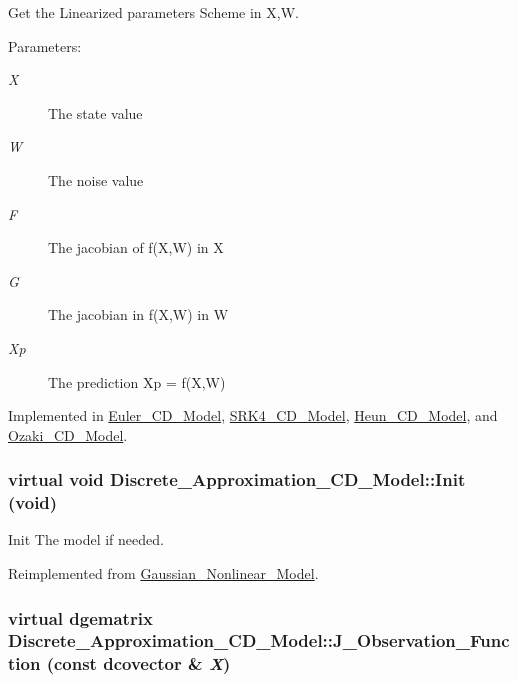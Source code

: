 Get the Linearized parameters Scheme in X,W. 

\begin{Desc}
\item[Parameters:]
\begin{description}
\item[{\em X}]The state value \item[{\em W}]The noise value \item[{\em F}]The jacobian of f(X,W) in X \item[{\em G}]The jacobian in f(X,W) in W \item[{\em Xp}]The prediction Xp = f(X,W) \end{description}
\end{Desc}


Implemented in \hyperlink{class_euler___c_d___model_e67b3130695db99e6057811914994aed}{Euler\_\-CD\_\-Model}, \hyperlink{class_s_r_k4___c_d___model_c348e8a59d0880ac366190004f4df36b}{SRK4\_\-CD\_\-Model}, \hyperlink{class_heun___c_d___model_38c51141d41b3c92509ab2c6040fd2cd}{Heun\_\-CD\_\-Model}, and \hyperlink{class_ozaki___c_d___model_c0878d9dda14cd1294e2ce7e5ab9c281}{Ozaki\_\-CD\_\-Model}.\hypertarget{class_discrete___approximation___c_d___model_0c4caaf9a2874a8e5219e72401caf908}{
\subsubsection[{Init}]{\setlength{\rightskip}{0pt plus 5cm}virtual void Discrete\_\-Approximation\_\-CD\_\-Model::Init (void)}}
\label{class_discrete___approximation___c_d___model_0c4caaf9a2874a8e5219e72401caf908}


Init The model if needed. 



Reimplemented from \hyperlink{class_gaussian___nonlinear___model_146f819d0aeea0dc59b86e9af200e0bd}{Gaussian\_\-Nonlinear\_\-Model}.\hypertarget{class_discrete___approximation___c_d___model_be25ebdd3667dff8f8f43b72dc4e59ef}{
\subsubsection[{J\_\-Observation\_\-Function}]{\setlength{\rightskip}{0pt plus 5cm}virtual dgematrix Discrete\_\-Approximation\_\-CD\_\-Model::J\_\-Observation\_\-Function (const dcovector \& {\em X})}}
\label{class_discrete___approximation___c_d___model_be25ebdd3667dff8f8f43b72dc4e59ef}


